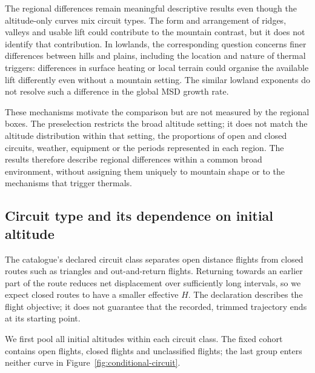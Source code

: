 \begin{table}[htbp]
 \centering\small
 
 \caption{Paired regional contrasts in $H$, after the terrain preselection:
 Low/High mountains for Alps--Pyrenees and Plains/Hills for the two lowland
 regions. Intervals are nominal 90\% site--day bootstrap intervals.}
 \label{tab:conditional-regions}
\end{table}

The regional differences remain meaningful descriptive results even though
the altitude-only curves mix circuit types. The form and arrangement of ridges,
valleys and usable lift could contribute to the mountain contrast, but it does
not identify that contribution. In lowlands, the corresponding question
concerns finer differences between hills and plains, including the location and
nature of thermal triggers: differences in surface heating or local terrain
could organise the available lift differently even without a mountain setting.
The similar lowland exponents do not resolve such a difference in the global
MSD growth rate.

These mechanisms motivate the comparison but are not measured by the regional
boxes. The preselection restricts the broad altitude setting; it does not match
the altitude distribution within that setting, the proportions of open and
closed circuits, weather, equipment or the periods represented in each region.
The results therefore describe
regional differences within a common broad environment, without assigning them
uniquely to mountain shape or to the mechanisms that trigger thermals.

\FloatBarrier
\subsection{Circuit type and its dependence on initial altitude}
\label{sec:conditional-circuit}

The catalogue's declared circuit class separates open distance flights from closed
routes such as triangles and out-and-return flights. Returning towards an earlier
part of the route reduces net displacement over sufficiently long intervals, so
we expect closed routes to have a smaller effective $H$. The declaration describes
the flight objective; it does not guarantee that the recorded, trimmed trajectory
ends at its starting point.

We first pool all initial altitudes within each circuit class. The fixed cohort contains
\ChThreeMainOpen{} open flights, \ChThreeMainClosed{} closed flights and
\ChThreeMainUnknown{} unclassified flights; the last group enters neither curve
in Figure~\ref{fig:conditional-circuit}.

